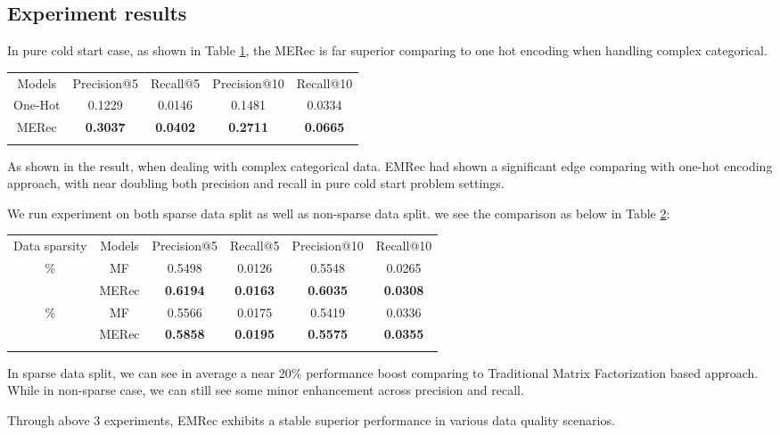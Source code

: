 \subsection{Experiment results}
In pure cold start case, as shown in Table \ref{tbl1}, the MERec is far superior comparing to one hot encoding when handling complex categorical.

\begin{table}
    {\begin{tabular}{@{}ccccc@{}}\toprule
    Models & Precision@5 & Recall@5 & Precision@10 & Recall@10 \\
    \colrule
    One-Hot\hphantom{00} & \hphantom{0} 0.1229 & \hphantom{0} 0.0146 & 0.1481 & 0.0334 \\
    MERec\hphantom{00} & \hphantom{0} \textbf{0.3037} & \hphantom{0} \textbf{0.0402} & \textbf{0.2711} & \textbf{0.0665} \\
    
    \botrule
    \end{tabular}
    }\label{tbl1}
    \end{table}
As shown in the result, when dealing with complex categorical data. EMRec had shown a significant edge comparing with one-hot encoding approach, with near doubling both precision and recall in pure cold start problem settings.

We run experiment on both sparse data split as well as non-sparse data split. we see the comparison as below in Table \ref{tbl2}: 
\begin{table}
    {\begin{tabular}{@{}cccccc@{}}\toprule
    Data sparsity &Models & Precision@5 & Recall@5 & Precision@10 & Recall@10 \\
    \colrule
    1.1\%&MF\hphantom{00} & \hphantom{0} 0.5498 & 0.0126 & 0.5548 & 0.0265 \\
    &MERec\hphantom{00} & \hphantom{0} \textbf{0.6194} & \textbf{0.0163} & \textbf{0.6035} & \textbf{0.0308} \\
    \colrule
    2.3\%&MF\hphantom{00} & 0.5566 & 0.0175 & 0.5419 & 0.0336 \\
    &MERec\hphantom{00} & \hphantom{0} \textbf{0.5858} & \textbf{0.0195} & \textbf{0.5575} & \textbf{0.0355} \\
    \botrule
    \end{tabular}
    }
    \label{tbl2}
\end{table}
In sparse data split, we can see in average a near 20\% performance boost comparing to Traditional Matrix Factorization based approach. 
While in non-sparse case, we can still see some minor enhancement across precision and recall.

Through above 3 experiments, EMRec exhibits a stable superior performance in various data quality scenarios.

